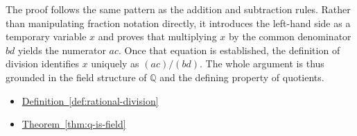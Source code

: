\begin{remark*}
The proof follows the same pattern as the addition and subtraction rules.
Rather than manipulating fraction notation directly, it introduces the
left-hand side as a temporary variable $x$ and proves that multiplying $x$
by the common denominator $bd$ yields the numerator $ac$.  Once that
equation is established, the definition of division identifies $x$
uniquely as $(ac)/(bd)$.  The whole argument is thus grounded in the field
structure of $\mathbb{Q}$ and the defining property of quotients.
\end{remark*}

\begin{dependencies}
\begin{itemize}
  \item \hyperref[def:rational-division]{Definition~\ref*{def:rational-division}}
  \item \hyperref[thm:q-is-field]{Theorem~\ref*{thm:q-is-field}}
\end{itemize}
\end{dependencies}

\clearpage

